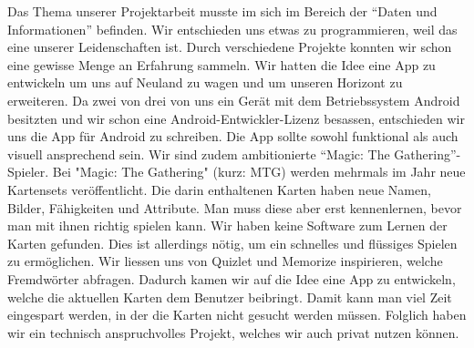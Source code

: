 Das Thema unserer Projektarbeit musste im sich im Bereich der "`Daten und Informationen"' befinden. Wir entschieden uns etwas zu programmieren, weil das eine unserer Leidenschaften ist. Durch verschiedene Projekte konnten wir schon eine gewisse Menge an Erfahrung sammeln. Wir hatten die Idee eine App zu entwickeln um uns auf Neuland zu wagen und um unseren Horizont zu erweiteren. Da zwei von drei von uns ein Ger\"at mit dem Betriebssystem Android besitzten  und wir schon eine Android-Entwickler-Lizenz besassen, entschieden wir uns die App für Android zu schreiben. Die App sollte sowohl funktional als auch visuell ansprechend sein. Wir sind zudem ambitionierte "`Magic: The Gathering"'-Spieler. Bei "Magic: The Gathering" (kurz: MTG) werden mehrmals im Jahr neue Kartensets ver\"offentlicht. Die darin enthaltenen Karten haben neue Namen, Bilder, Fähigkeiten und Attribute. Man muss diese aber erst kennenlernen, bevor man mit ihnen richtig spielen kann.  Wir haben keine Software zum Lernen der Karten gefunden. Dies ist allerdings n\"otig, um ein schnelles und fl\"ussiges Spielen zu ermöglichen. Wir liessen uns von Quizlet und Memorize inspirieren, welche Fremdw\"orter abfragen. Dadurch kamen wir auf die Idee eine App zu entwickeln, welche die aktuellen Karten dem Benutzer beibringt. Damit kann man viel Zeit eingespart werden, in der die Karten nicht gesucht werden müssen. Folglich haben wir ein technisch anspruchvolles Projekt, welches wir auch privat nutzen k\"onnen.